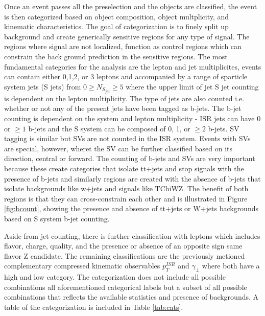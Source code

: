 Once an event passes all the preselection and the objects are classified, the event is then categorized based on object composition, object multplicity, and kinematic characteristics. The goal of categorization is to finely split up background and create generically sensitive regions for any type of signal. The regions where signal are not localized, function as control regions which can constrain the back ground prediction in the sensitive regions. The most fundamental categories for the analysis are the lepton and jet multiplicites, events can contain either 0,1,2, or 3 leptons and accompanied by a range of sparticle system jets (S jets) from $0\geq N_{S_{jet}} \geq 5$ where the upper limit of jet S jet counting is dependent on the lepton multiplicity. The type of jets are also counted i.e. whether or not any of the present jets have been tagged as b-jets. The b-jet counting is dependent on the system and lepton multiplicity - ISR jets can have 0 or $\geq 1$ b-jets and the S system can be composed of 0, 1, or $\geq2$ b-jets. SV tagging is similar but SVs are not counted in the ISR system. Events with SVs are special, however, wheret the SV can be further classified based on its direction, central or forward. The counting of b-jets and SVs are very important because these create categories that isolate tt+jets and stop signals with the presence of b-jets and similarly regions are created with the absence of b-jets that isolate backgrounds like w+jets and signals like TChiWZ. The benefit of both regions is that they can cross-constrain each other and is illustrated in Figure \ref{fig:bcount}, showing the presence and absence of tt+jets or W+jets backgrounds based on S system b-jet counting.

Aside from jet counting, there is further classification with leptons which includes flavor, charge, quality, and the presence or absence of an opposite sign same flavor Z candidate. The remaining classifications are the previously metioned complementary compressed kinematic observables $p_T^{ISR}$ and $\gamma_\perp$ where both have a high and low category.    The categorization does not include all possible combinations all aforementioned categorical labels but a subset of all possible combinations that reflects the available statistics and presence of backgrounds. A  table of the categorization is included in Table \ref{tab:cats}. 

